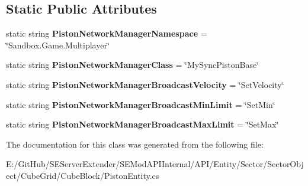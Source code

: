 \subsection*{Static Public Attributes}
\begin{DoxyCompactItemize}
\item 
\hypertarget{class_s_e_mod_a_p_i_internal_1_1_a_p_i_1_1_entity_1_1_sector_1_1_sector_object_1_1_cube_grid_1_125d4a251862e95777b41b851d1ed7712_aae6353d287525e8ec8f825e3451aca05}{}static string {\bfseries Piston\+Network\+Manager\+Namespace} = \char`\"{}Sandbox.\+Game.\+Multiplayer\char`\"{}\label{class_s_e_mod_a_p_i_internal_1_1_a_p_i_1_1_entity_1_1_sector_1_1_sector_object_1_1_cube_grid_1_125d4a251862e95777b41b851d1ed7712_aae6353d287525e8ec8f825e3451aca05}

\item 
\hypertarget{class_s_e_mod_a_p_i_internal_1_1_a_p_i_1_1_entity_1_1_sector_1_1_sector_object_1_1_cube_grid_1_125d4a251862e95777b41b851d1ed7712_a2c7225cb72145dddba11cf350cc5c3f6}{}static string {\bfseries Piston\+Network\+Manager\+Class} = \char`\"{}My\+Sync\+Piston\+Base\char`\"{}\label{class_s_e_mod_a_p_i_internal_1_1_a_p_i_1_1_entity_1_1_sector_1_1_sector_object_1_1_cube_grid_1_125d4a251862e95777b41b851d1ed7712_a2c7225cb72145dddba11cf350cc5c3f6}

\item 
\hypertarget{class_s_e_mod_a_p_i_internal_1_1_a_p_i_1_1_entity_1_1_sector_1_1_sector_object_1_1_cube_grid_1_125d4a251862e95777b41b851d1ed7712_a9aa38012ed18907e4ceac026e1dbd4ea}{}static string {\bfseries Piston\+Network\+Manager\+Broadcast\+Velocity} = \char`\"{}Set\+Velocity\char`\"{}\label{class_s_e_mod_a_p_i_internal_1_1_a_p_i_1_1_entity_1_1_sector_1_1_sector_object_1_1_cube_grid_1_125d4a251862e95777b41b851d1ed7712_a9aa38012ed18907e4ceac026e1dbd4ea}

\item 
\hypertarget{class_s_e_mod_a_p_i_internal_1_1_a_p_i_1_1_entity_1_1_sector_1_1_sector_object_1_1_cube_grid_1_125d4a251862e95777b41b851d1ed7712_a64276c6c421616b2b60cde2f5b5fc49b}{}static string {\bfseries Piston\+Network\+Manager\+Broadcast\+Min\+Limit} = \char`\"{}Set\+Min\char`\"{}\label{class_s_e_mod_a_p_i_internal_1_1_a_p_i_1_1_entity_1_1_sector_1_1_sector_object_1_1_cube_grid_1_125d4a251862e95777b41b851d1ed7712_a64276c6c421616b2b60cde2f5b5fc49b}

\item 
\hypertarget{class_s_e_mod_a_p_i_internal_1_1_a_p_i_1_1_entity_1_1_sector_1_1_sector_object_1_1_cube_grid_1_125d4a251862e95777b41b851d1ed7712_aae00c00ab3a6d73f06fc32821de44384}{}static string {\bfseries Piston\+Network\+Manager\+Broadcast\+Max\+Limit} = \char`\"{}Set\+Max\char`\"{}\label{class_s_e_mod_a_p_i_internal_1_1_a_p_i_1_1_entity_1_1_sector_1_1_sector_object_1_1_cube_grid_1_125d4a251862e95777b41b851d1ed7712_aae00c00ab3a6d73f06fc32821de44384}

\end{DoxyCompactItemize}


The documentation for this class was generated from the following file\+:\begin{DoxyCompactItemize}
\item 
E\+:/\+Git\+Hub/\+S\+E\+Server\+Extender/\+S\+E\+Mod\+A\+P\+I\+Internal/\+A\+P\+I/\+Entity/\+Sector/\+Sector\+Object/\+Cube\+Grid/\+Cube\+Block/Piston\+Entity.\+cs\end{DoxyCompactItemize}
